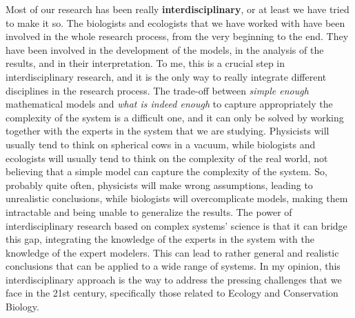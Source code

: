Most of our research has been really \textbf{interdisciplinary}, or at least
we have tried to make it so. The biologists and ecologists that we have worked
with have been involved in the whole research process, from the very beginning
to the end. They have been involved in the development of the models, in the
analysis of the results, and in their interpretation. To me, this
is a crucial step in interdisciplinary research, and it is the only way to
really integrate different disciplines in the research process. The trade-off
between \textit{simple enough} mathematical models and \textit{what is indeed
    enough} to capture appropriately the complexity of the system is a
difficult one, and it can only be solved by working together with the experts
in the system that we are studying. Physicists will usually tend to think on
spherical cows in a vacuum, while biologists and ecologists will usually tend
to think on the complexity of the real world, not believing that a simple
model can capture the complexity of the system. So, probably quite often,
physicists will make wrong assumptions, leading to unrealistic conclusions,
while biologists will overcomplicate models, making them intractable and being
unable to generalize the results. The power of interdisciplinary research based
on complex systems' science is that it can bridge this gap, integrating the
knowledge of the experts in the system with the knowledge of the expert
modelers. This can lead to rather general and realistic conclusions that can
be applied to a wide range of systems. In my opinion, this interdisciplinary
approach is the way to address the pressing challenges that we face in the 21st
century, specifically those related to Ecology and Conservation Biology.


